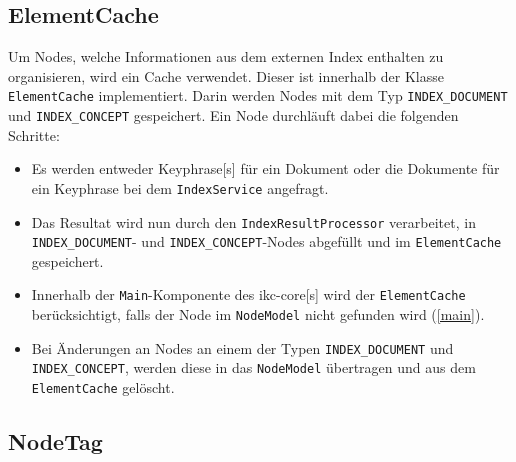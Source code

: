 \subsection{ElementCache}


Um Nodes, welche Informationen aus dem externen Index enthalten zu organisieren, wird ein Cache verwendet. Dieser ist innerhalb der Klasse \texttt{ElementCache} implementiert. Darin werden Nodes mit dem Typ \verb|INDEX_DOCUMENT| und \verb|INDEX_CONCEPT| gespeichert. Ein Node durchläuft dabei die folgenden Schritte:
\begin{itemize}
    \item Es werden entweder \gls{Keyphrase}[s] für ein Dokument oder die Dokumente für ein \gls{Keyphrase} bei dem \texttt{IndexService} angefragt. 
    \item Das Resultat wird nun durch den \texttt{Index\-Result\-Pro\-cessor} verarbeitet, in \verb|INDEX_DOCUMENT|- und \verb|INDEX_CONCEPT|-Nodes abgefüllt und im \texttt{ElementCache} gespeichert.
    \item Innerhalb der \texttt{Main}-Komponente des \gls{ikc-core}[s] wird der \texttt{Ele\-ment\-Cache} berücksichtigt, falls der Node im \texttt{NodeModel} nicht gefunden wird (\autoref{main}).
    
    
    \item Bei Änderungen an Nodes an einem der Typen \verb|INDEX_DOCUMENT| und \verb|INDEX_CONCEPT|, werden diese in das \texttt{NodeModel} übertragen und aus dem \texttt{ElementCache} gelöscht.

\end{itemize}


\subsection{NodeTag}

